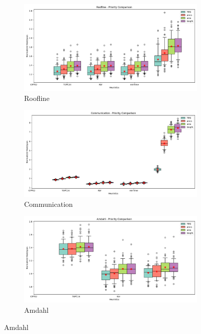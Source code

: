 \documentclass{article}
\begin{document}
\begin{figure}[htbp]
\centering
\begin{subfigure}[b]{0.32\textwidth}\includegraphics[width=\textwidth]{Results/Priority/Priority_Roofline_boxplot}\caption{Roofline}\label{fig:boxplot_figures_Priority_Roofline}\end{subfigure}
\hfill
\begin{subfigure}[b]{0.32\textwidth}\includegraphics[width=\textwidth]{Results/Priority/Priority_Communication_boxplot}\caption{Communication}\label{fig:boxplot_figures_Priority_Communication}\end{subfigure}
\hfill
\begin{subfigure}[b]{0.32\textwidth}\includegraphics[width=\textwidth]{Results/Priority/Priority_Amdahl_boxplot}\caption{Amdahl}\label{fig:boxplot_figures_Priority_Amdahl}\end{subfigure}

\end{figure}
\end{document}
